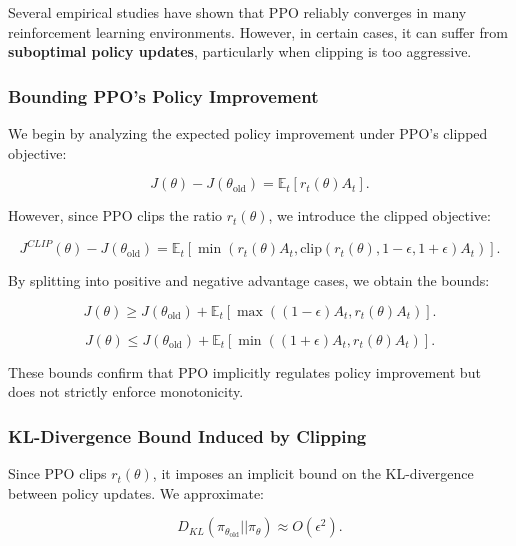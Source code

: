 \documentclass[12pt]{extreport} %
\begin{document}
Several empirical studies have shown that PPO reliably converges in many reinforcement learning environments. However, in certain cases, it can suffer from \textbf{suboptimal policy updates}, particularly when clipping is too aggressive.

\subsubsection{\textbf{Bounding PPO's Policy Improvement}}

We begin by analyzing the expected policy improvement under PPO's clipped objective:

\begin{equation}
J(\theta) - J(\theta_{\text{old}}) = \mathbb{E}_t \left[ r_t(\theta) A_t \right].
\end{equation}

However, since PPO clips the ratio \( r_t(\theta) \), we introduce the clipped objective:

\begin{equation}
J^{CLIP}(\theta) - J(\theta_{\text{old}}) = \mathbb{E}_t \left[ \min(r_t(\theta) A_t, \text{clip}(r_t(\theta), 1-\epsilon, 1+\epsilon) A_t ) \right].
\end{equation}

By splitting into positive and negative advantage cases, we obtain the bounds:

\begin{equation}
J(\theta) \geq J(\theta_{\text{old}}) + \mathbb{E}_t \left[ \max((1 - \epsilon) A_t, r_t(\theta) A_t) \right].
\end{equation}

\begin{equation}
J(\theta) \leq J(\theta_{\text{old}}) + \mathbb{E}_t \left[ \min((1 + \epsilon) A_t, r_t(\theta) A_t) \right].
\end{equation}

These bounds confirm that PPO implicitly regulates policy improvement but does not strictly enforce monotonicity.

\subsubsection{\textbf{KL-Divergence Bound Induced by Clipping}}

Since PPO clips \( r_t(\theta) \), it imposes an implicit bound on the KL-divergence between policy updates. We approximate:

\begin{equation}
D_{KL}(\pi_{\theta_{\text{old}}} || \pi_{\theta}) \approx O(\epsilon^2).
\end{equation}
\end{document}
